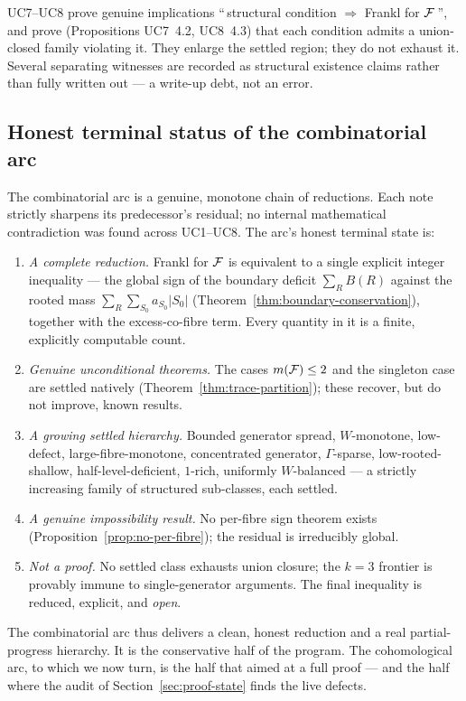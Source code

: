\begin{status}
UC7--UC8 prove genuine implications ``\,structural condition $\Rightarrow$
Frankl for $\mathcal{F}$\,'', and prove (Propositions UC7~4.2, UC8~4.3) that
each condition admits a union-closed family violating it. They enlarge
the settled region; they do not exhaust it. Several separating
witnesses are recorded as structural existence claims rather than fully
written out --- a write-up debt, not an error.
\end{status}

\subsection{Honest terminal status of the combinatorial arc}
\label{ssec:combinatorial-status}

The combinatorial arc is a genuine, monotone chain of reductions. Each
note strictly sharpens its predecessor's residual; no internal
mathematical contradiction was found across UC1--UC8. The arc's honest
terminal state is:

\begin{enumerate}[leftmargin=1.6em]
\item \emph{A complete reduction.} Frankl for $\mathcal{F}$ is equivalent to a
  single explicit integer inequality --- the global sign of the
  boundary deficit $\sum_R B(R)$ against the rooted mass $\sum_R
  \sum_{S_0}a_{S_0}|S_0|$ (Theorem~\ref{thm:boundary-conservation}),
  together with the excess-co-fibre term. Every quantity in it is a
  finite, explicitly computable count.
\item \emph{Genuine unconditional theorems.} The cases $m(\mathcal{F})\le2$ and
  the singleton case are settled natively
  (Theorem~\ref{thm:trace-partition}); these recover, but do not
  improve, known results.
\item \emph{A growing settled hierarchy.} Bounded generator spread,
  $W$-monotone, low-defect, large-fibre-monotone, concentrated
  generator, $\Gamma$-sparse, low-rooted-shallow, half-level-deficient,
  $1$-rich, uniformly $W$-balanced --- a strictly increasing family of
  structured sub-classes, each settled.
\item \emph{A genuine impossibility result.} No per-fibre sign theorem
  exists (Proposition~\ref{prop:no-per-fibre}); the residual is
  irreducibly global.
\item \emph{Not a proof.} No settled class exhausts union closure; the
  $k=3$ frontier is provably immune to single-generator arguments. The
  final inequality is reduced, explicit, and \emph{open}.
\end{enumerate}

\noindent The combinatorial arc thus delivers a clean, honest
reduction and a real partial-progress hierarchy. It is the conservative
half of the program. The cohomological arc, to which we now turn, is
the half that aimed at a full proof --- and the half where the audit of
Section~\ref{sec:proof-state} finds the live defects.
